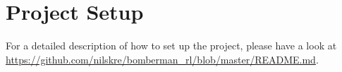 \setcounter{section}{-1}
\section{Project Setup}

For a detailed description of how to set up the project, please have a look at \url{https://github.com/nilskre/bomberman_rl/blob/master/README.md}.